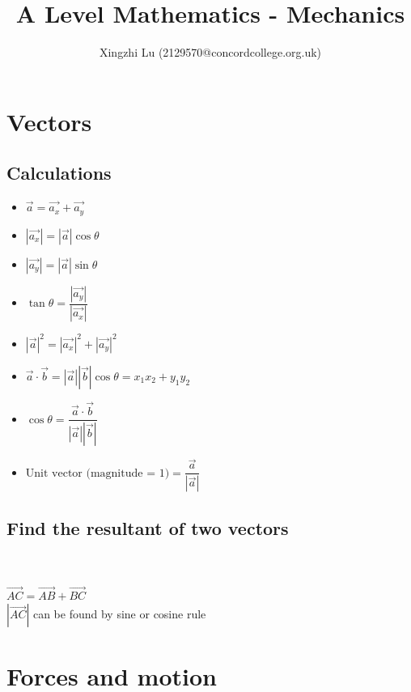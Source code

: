 \documentclass[A4paper]{article}
\title{A Level Mathematics - Mechanics}
\author{Xingzhi Lu (2129570@concordcollege.org.uk)}
\begin{document}
	\maketitle

	\section{Vectors}
	\subsection{Calculations}
	\begin{itemize}
		\item $\vec{a}=\vec{a_x}+\vec{a_y}$
		\item $|\vec{a_x}|=|\vec{a}|\cos\theta$
		\item $|\vec{a_y}|=|\vec{a}|\sin\theta$
		\item $\tan\theta = \dfrac{|\vec{a_y}|}{|\vec{a_x}|}$
		\item $|\vec{a}|^2=|\vec{a_x}|^2+|\vec{a_y}|^2$
		\item $\vec{a} \cdot \vec{b} = |\vec{a}||\vec{b}|\cos\theta = x_1x_2+y_1y_2$
		\item $\cos \theta = \dfrac{\vec{a} \cdot \vec{b}}{|\vec{a}||\vec{b}|}$
		\item $\text{Unit vector (magnitude = 1)} = \dfrac{\vec{a}}{|\vec{a}|}$

	\end{itemize}
	\subsection{Find the resultant of two vectors}
	\\
	\\
	$\overrightarrow{AC}=\overrightarrow{AB}+\overrightarrow{BC}$\\
	$|\overrightarrow{AC}|$ can be found by sine or cosine rule

	\pagebreak

	\section{Forces and motion}
	
\end{document}

